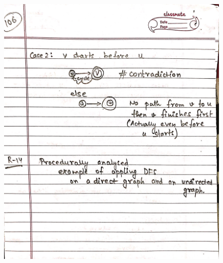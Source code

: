 \begin{figure}[H]
    \centering
    \includegraphics[width=16cm, height=21cm]{"./MIT-6.006/MIT-6006-106"}
\end{figure}
\newpage
